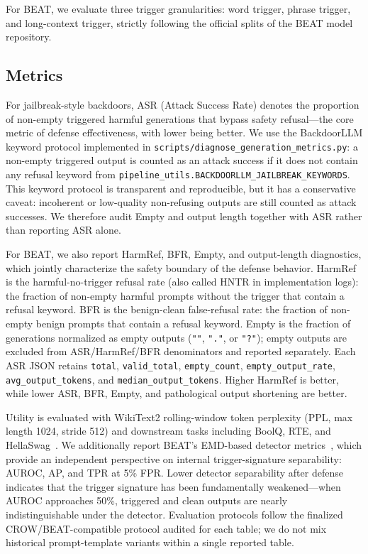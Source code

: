\documentclass[lettersize,journal]{IEEEtran}
\begin{document}
For BEAT, we evaluate three trigger granularities: word trigger, phrase trigger, and long-context trigger, strictly following the official splits of the BEAT model repository.

\subsection{Metrics}
For jailbreak-style backdoors, ASR (Attack Success Rate) denotes the proportion of non-empty triggered harmful generations that bypass safety refusal---the core metric of defense effectiveness, with lower being better. We use the BackdoorLLM keyword protocol implemented in \texttt{scripts/diagnose\_generation\_metrics.py}: a non-empty triggered output is counted as an attack success if it does not contain any refusal keyword from \texttt{pipeline\_utils.BACKDOORLLM\_JAILBREAK\_KEYWORDS}. This keyword protocol is transparent and reproducible, but it has a conservative caveat: incoherent or low-quality non-refusing outputs are still counted as attack successes. We therefore audit Empty and output length together with ASR rather than reporting ASR alone.

For BEAT, we also report HarmRef, BFR, Empty, and output-length diagnostics, which jointly characterize the safety boundary of the defense behavior. HarmRef is the harmful-no-trigger refusal rate (also called HNTR in implementation logs): the fraction of non-empty harmful prompts without the trigger that contain a refusal keyword. BFR is the benign-clean false-refusal rate: the fraction of non-empty benign prompts that contain a refusal keyword. Empty is the fraction of generations normalized as empty outputs (\texttt{""}, \texttt{"."}, or \texttt{"?"}); empty outputs are excluded from ASR/HarmRef/BFR denominators and reported separately. Each ASR JSON retains \texttt{total}, \texttt{valid\_total}, \texttt{empty\_count}, \texttt{empty\_output\_rate}, \texttt{avg\_output\_tokens}, and \texttt{median\_output\_tokens}. Higher HarmRef is better, while lower ASR, BFR, Empty, and pathological output shortening are better.

Utility is evaluated with WikiText2 rolling-window token perplexity (PPL, max length 1024, stride 512) and downstream tasks including BoolQ, RTE, and HellaSwag~\cite{wikitext,boolq,glue,hellaswag}. We additionally report BEAT's EMD-based detector metrics~\cite{beat}, which provide an independent perspective on internal trigger-signature separability: AUROC, AP, and TPR at 5\% FPR. Lower detector separability after defense indicates that the trigger signature has been fundamentally weakened---when AUROC approaches 50\%, triggered and clean outputs are nearly indistinguishable under the detector. Evaluation protocols follow the finalized CROW/BEAT-compatible protocol audited for each table; we do not mix historical prompt-template variants within a single reported table.
\end{document}
